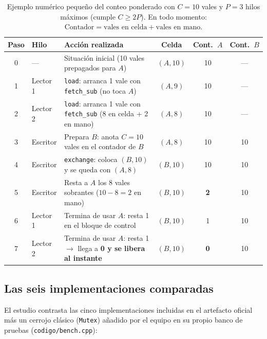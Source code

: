 \documentclass[11pt,a4paper]{article}
\begin{document}
\begin{table}[H]
\centering
\caption{Ejemplo numérico pequeño del conteo ponderado con $C = 10$ vales y $P = 3$ hilos máximos (cumple $C \ge 2P$). En todo momento: $\text{Contador} = \text{vales en celda} + \text{vales en mano}$.}
\label{tab:traza_vales}
\footnotesize
\begin{tabularx}{\linewidth}{@{}c l >{\raggedright\arraybackslash}X c c c@{}}
\toprule
\textbf{Paso} & \textbf{Hilo} & \textbf{Acción realizada} & \textbf{Celda} & \textbf{Cont.\ $A$} & \textbf{Cont.\ $B$} \\
\midrule
0 & — & Situación inicial (10 vales prepagados para $A$) & $(A, 10)$ & 10 & — \\
1 & Lector 1 & \texttt{load}: arranca 1 vale con \texttt{fetch\_sub} (no toca $A$) & $(A, 9)$ & 10 & — \\
2 & Lector 2 & \texttt{load}: arranca 1 vale con \texttt{fetch\_sub} (8 en celda + 2 en mano) & $(A, 8)$ & 10 & — \\
3 & Escritor & Prepara $B$: anota $C = 10$ vales en el contador de $B$ & $(A, 8)$ & 10 & 10 \\
4 & Escritor & \texttt{exchange}: coloca $(B, 10)$ y se queda con $(A, 8)$ & $(B, 10)$ & 10 & 10 \\
5 & Escritor & Resta a $A$ los 8 vales sobrantes ($10 - 8 = 2$ en mano) & $(B, 10)$ & \textbf{2} & 10 \\
6 & Lector 1 & Termina de usar $A$: resta 1 en el bloque de control & $(B, 10)$ & 1 & 10 \\
7 & Lector 2 & Termina de usar $A$: resta 1 $\to$ llega a \textbf{0 y se libera al instante} & $(B, 10)$ & \textbf{0} & 10 \\
\bottomrule
\end{tabularx}
\end{table}

\subsection{Las seis implementaciones comparadas}
El estudio contrasta las cinco implementaciones incluidas en el artefacto oficial~\cite{dewolff2024artifact} más un cerrojo clásico (\texttt{Mutex}) añadido por el equipo en su propio banco de pruebas (\texttt{codigo/bench.cpp}):
\end{document}
